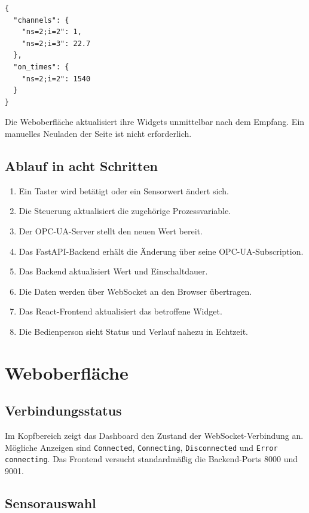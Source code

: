 \documentclass[11pt,a4paper,parskip=half]{scrartcl}
\newcommand{\code}[1]{\texttt{#1}}
\begin{document}
\begin{lstlisting}[style=terminal,language={},caption={Vereinfachte WebSocket-Nachricht}]
{
  "channels": {
    "ns=2;i=2": 1,
    "ns=2;i=3": 22.7
  },
  "on_times": {
    "ns=2;i=2": 1540
  }
}
\end{lstlisting}

Die Weboberfläche aktualisiert ihre Widgets unmittelbar nach dem Empfang. Ein manuelles Neuladen der Seite ist nicht erforderlich.

\subsection{Ablauf in acht Schritten}

\begin{enumerate}
  \item Ein Taster wird betätigt oder ein Sensorwert ändert sich.
  \item Die Steuerung aktualisiert die zugehörige Prozessvariable.
  \item Der OPC-UA-Server stellt den neuen Wert bereit.
  \item Das FastAPI-Backend erhält die Änderung über seine OPC-UA-Subscription.
  \item Das Backend aktualisiert Wert und Einschaltdauer.
  \item Die Daten werden über WebSocket an den Browser übertragen.
  \item Das React-Frontend aktualisiert das betroffene Widget.
  \item Die Bedienperson sieht Status und Verlauf nahezu in Echtzeit.
\end{enumerate}

\section{Weboberfläche}

\subsection{Verbindungsstatus}

Im Kopfbereich zeigt das Dashboard den Zustand der WebSocket-Verbindung an. Mögliche Anzeigen sind \code{Connected}, \code{Connecting}, \code{Disconnected} und \code{Error connecting}. Das Frontend versucht standardmäßig die Backend-Ports 8000 und 9001.

\subsection{Sensorauswahl}
\end{document}
